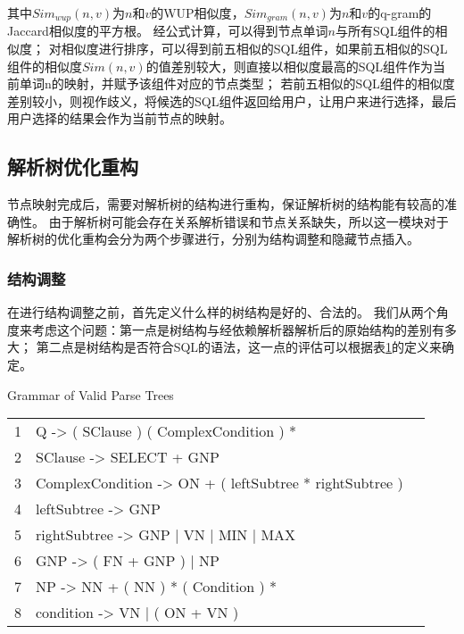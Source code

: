 其中$Sim_{wup}(n,v)$为$n$和$v$的WUP相似度\cite{wu1994verb}，$Sim_{gram}(n,v)$为$n$和$v$的q-gram的Jaccard相似度的平方根\cite{xiao2011efficient}。
经公式计算，可以得到节点单词$n$与所有SQL组件的相似度；
对相似度进行排序，可以得到前五相似的SQL组件，如果前五相似的SQL组件的相似度$Sim(n,v)$的值差别较大，则直接以相似度最高的SQL组件作为当前单词n的映射，并赋予该组件对应的节点类型；
若前五相似的SQL组件的相似度差别较小，则视作歧义，将候选的SQL组件返回给用户，让用户来进行选择，最后用户选择的结果会作为当前节点的映射。 

\subsection{解析树优化重构}
\label{nli:jxsyhcg}

节点映射完成后，需要对解析树的结构进行重构，保证解析树的结构能有较高的准确性。
由于解析树可能会存在关系解析错误和节点关系缺失，所以这一模块对于解析树的优化重构会分为两个步骤进行，分别为结构调整和隐藏节点插入。

\subsubsection{结构调整}

在进行结构调整之前，首先定义什么样的树结构是好的、合法的。
我们从两个角度来考虑这个问题：第一点是树结构与经依赖解析器解析后的原始结构的差别有多大；
第二点是树结构是否符合SQL的语法，这一点的评估可以根据表\ref{nli:hfjxsjggz}的定义来确定\cite{li2014constructing}。

\begin{table}[!hpb]
    \centering
      {Grammar of Valid Parse Trees}
    \label{nli:hfjxsjggz}
    \begin{tabular}{@{}llr@{}} \toprule
      1  & 	Q -> ( SClause ) ( ComplexCondition ) *\\
      2  & 	SClause -> SELECT + GNP\\
      3  & 	ComplexCondition -> ON + ( leftSubtree * rightSubtree )\\
      4  & 	leftSubtree -> GNP\\
      5  & 	rightSubtree -> GNP | VN | MIN | MAX\\
      6  & 	GNP -> ( FN + GNP ) | NP\\
      7  & 	NP -> NN + ( NN ) * ( Condition ) *\\
      8  & 	condition -> VN | ( ON + VN )\\\bottomrule
    \end{tabular}
  \end{table}

